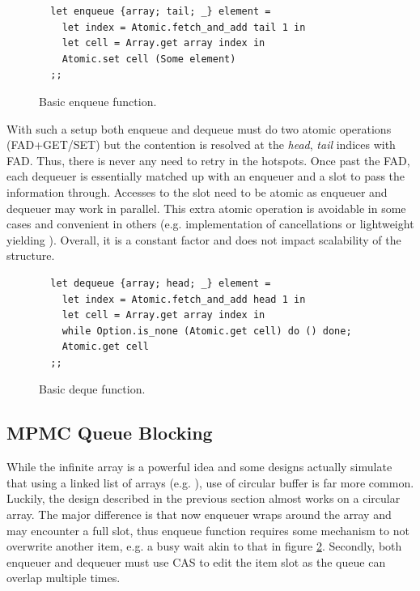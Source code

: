 \documentclass[12pt,a4paper,twoside]{report}
\begin{document}
\begin{figure}
    \centering
    \begin{verbatim}
  let enqueue {array; tail; _} element = 
    let index = Atomic.fetch_and_add tail 1 in
    let cell = Array.get array index in 
    Atomic.set cell (Some element)
  ;;
    \end{verbatim}
    \caption{Basic enqueue function.}
    \label{fig:basic-enqueue}
\end{figure}


With such a setup both enqueue and dequeue must do two atomic operations (FAD+GET/SET) but the contention is resolved at the \textit{head}, \textit{tail} indices with FAD. Thus, there is never any need to retry in the hotspots. Once past the FAD, each dequeuer is essentially matched up with an enqueuer and a slot to pass the information through. Accesses to the slot need to be atomic as enqueuer and dequeuer may work in parallel. This extra atomic operation is avoidable in some cases and convenient in others (e.g. implementation of cancellations or lightweight yielding ). Overall, it is a constant factor and does not impact scalability of the structure.


\begin{figure}
    \centering
    \begin{verbatim}
  let dequeue {array; head; _} element = 
    let index = Atomic.fetch_and_add head 1 in
    let cell = Array.get array index in 
    while Option.is_none (Atomic.get cell) do () done;
    Atomic.get cell
  ;;
    \end{verbatim}
    \caption{Basic deque function.}
    \label{fig:basic-deque}
\end{figure}

\subsection{MPMC Queue Blocking}
\label{section:blocking_mpmc}

While the infinite array is a powerful idea and some designs actually simulate that using a linked list of arrays (e.g. \cite{Sundell2011}), use of circular buffer is far more common. Luckily, the design described in the previous section almost works on a circular array. The major difference is that now enqueuer wraps around the array and may encounter a full slot, thus enqueue function requires some mechanism to not overwrite another item, e.g. a busy wait akin to that in figure \ref{fig:basic-deque}. Secondly, both enqueuer and dequeuer must use CAS to edit the item slot as the queue can overlap multiple times. 
\end{document}
